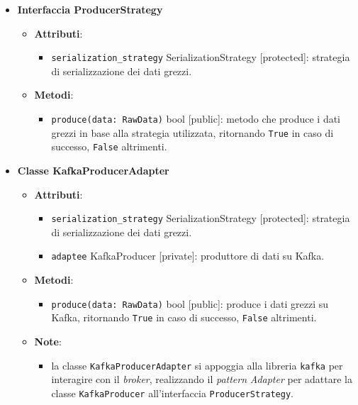 \begin{itemize}
	\item \textbf{Interfaccia ProducerStrategy}
	      \begin{itemize}
		      \item \textbf{Attributi}:
		            \begin{itemize}
			            \item \texttt{serialization\_strategy} SerializationStrategy [protected]: strategia di serializzazione dei dati grezzi.
		            \end{itemize}
		      \item \textbf{Metodi}:
		            \begin{itemize}
			            \item \texttt{produce(data: RawData)} bool [public]: metodo che produce i dati grezzi in base alla strategia utilizzata, ritornando \texttt{True} in caso di successo, \texttt{False} altrimenti.
		            \end{itemize}
	      \end{itemize}
	\item \textbf{Classe KafkaProducerAdapter}
	      \begin{itemize}
		      \item \textbf{Attributi}:
		            \begin{itemize}
			            \item \texttt{serialization\_strategy} SerializationStrategy [protected]: strategia di serializzazione dei dati grezzi.
			            \item \texttt{adaptee} KafkaProducer [private]: produttore di dati su Kafka.
		            \end{itemize}
		      \item \textbf{Metodi}:
		            \begin{itemize}
			            \item \texttt{produce(data: RawData)} bool [public]: produce i dati grezzi su Kafka, ritornando \texttt{True} in caso di successo, \texttt{False} altrimenti.
		            \end{itemize}
		      \item \textbf{Note}:
		            \begin{itemize}
			            \item la classe \texttt{KafkaProducerAdapter} si appoggia alla libreria \texttt{kafka} per interagire con il \textit{broker}, realizzando
			                  il \textit{pattern} \textit{Adapter} per adattare la classe \texttt{KafkaProducer} all'interfaccia \texttt{ProducerStrategy}.

\end{itemize}
\end{itemize}
\end{itemize}

